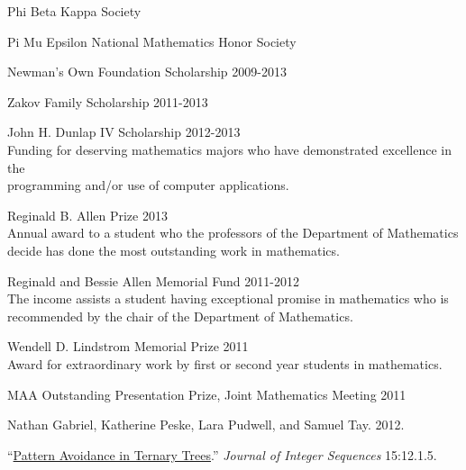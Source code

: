\documentclass[11pt,article,oneside]{memoir}
\begin{document}
\ind Phi Beta Kappa Society

\ind Pi Mu Epsilon National Mathematics Honor Society

\ind Newman's Own Foundation Scholarship \hfill {\small 2009-2013}

\ind Zakov Family Scholarship \hfill {\small 2011-2013}

\ind John H. Dunlap IV Scholarship \hfill {\small 2012-2013} \\
\footnotesize
  Funding for deserving mathematics majors who have demonstrated excellence in
  the \\ programming and/or use of computer applications.
\normalsize

\ind Reginald B. Allen Prize \hfill {\small 2013} \\
\footnotesize
  Annual award to a student who the professors of the Department of
  Mathematics decide has done the most outstanding work in mathematics.
\normalsize

\ind Reginald and Bessie Allen Memorial Fund \hfill {\small 2011-2012} \\
\footnotesize
  The income assists a student having exceptional promise in mathematics who is
  recommended by the chair of the Department of Mathematics.
\normalsize

\ind Wendell D. Lindstrom Memorial Prize \hfill {\small 2011} \\
\footnotesize
  Award for extraordinary work by first or second year students in mathematics.
\normalsize

\ind MAA Outstanding Presentation Prize, Joint Mathematics Meeting \hfill {\small 2011} \\


\ind Nathan Gabriel, Katherine Peske, Lara Pudwell, and Samuel Tay. 2012.

\noindent ``\href{http://arxiv.org/abs/1110.2225}{Pattern Avoidance in Ternary Trees}.''
  \emph{Journal of Integer Sequences} 15:12.1.5. \vspace{0.05in}
\end{document}
